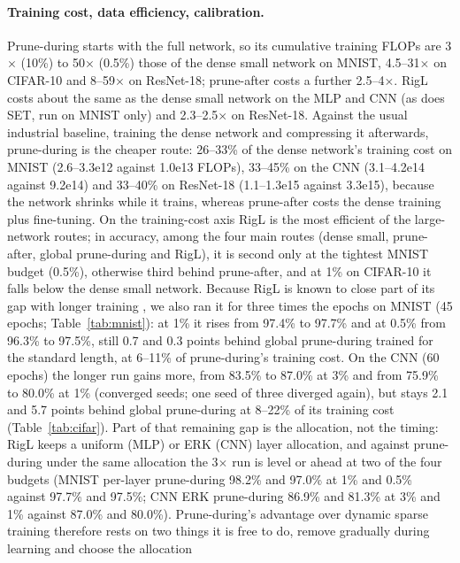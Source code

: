 \documentclass[11pt]{article}
\begin{document}
\paragraph{Training cost, data efficiency, calibration.} Prune-during starts with the full network, so its cumulative training
FLOPs are 3$\times$ (10\%) to 50$\times$ (0.5\%) those of the dense small network on MNIST, 4.5--31$\times$ on CIFAR-10 and
8--59$\times$ on ResNet-18; prune-after costs a further 2.5--4$\times$. RigL costs about the same as the dense small network
on the MLP and CNN (as does SET, run on MNIST only) and 2.3--2.5$\times$ on ResNet-18. Against the usual industrial
baseline, training the dense network and compressing it afterwards, prune-during is the cheaper route: 26--33\% of the
dense network's training cost on MNIST (2.6--3.3e12 against 1.0e13 FLOPs), 33--45\% on the CNN (3.1--4.2e14 against 9.2e14)
and 33--40\% on ResNet-18 (1.1--1.3e15 against 3.3e15), because the network shrinks while it trains, whereas prune-after
costs the dense training plus fine-tuning. On the training-cost axis RigL is the most efficient of the
large-network routes; in accuracy, among the four main routes (dense small, prune-after, global prune-during
and RigL), it is second only at the tightest MNIST budget (0.5\%), otherwise third behind prune-after, and at 1\% on CIFAR-10 it falls below the dense small network. Because RigL is known to
close part of its gap with longer training \citep{evci2020}, we also ran it for three times the epochs on MNIST (45 epochs;
Table~\ref{tab:mnist}): at 1\% it rises from 97.4\% to 97.7\% and at 0.5\% from 96.3\% to 97.5\%, still 0.7 and 0.3
points behind global prune-during trained for the standard length, at 6--11\% of prune-during's training cost. On the CNN
(60 epochs) the longer run gains more, from 83.5\% to 87.0\% at 3\% and from 75.9\% to 80.0\% at 1\% (converged seeds;
one seed of three diverged again), but stays 2.1 and 5.7 points behind global prune-during at 8--22\% of its training
cost (Table~\ref{tab:cifar}). Part of that remaining gap is the allocation, not the timing: RigL keeps a uniform (MLP) or
ERK (CNN) layer allocation, and against prune-during under the same allocation the 3$\times$ run is level or ahead at two
of the four budgets (MNIST per-layer prune-during 98.2\% and 97.0\% at 1\% and 0.5\% against 97.7\% and 97.5\%; CNN
ERK prune-during 86.9\% and 81.3\% at 3\% and 1\% against 87.0\% and 80.0\%). Prune-during's advantage over dynamic
sparse training therefore rests on two things it is free to do, remove gradually during learning and choose the allocation
\end{document}
